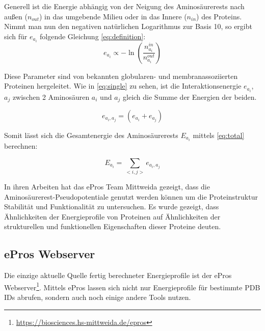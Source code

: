 Generell ist die Energie abhängig von der Neigung des Aminosäurerests nach außen ($n_{out}$) in das umgebende Milieu oder in das Innere ($n_{in}$) des Proteins. Nimmt man nun den negativen natürlichen Logarithmus zur Basis 10, so ergibt sich für $e_{a_i}$ folgende Gleichung \ref{eq:definition}:
%
\begin{equation}
  	e_{a_i} \propto -\ln{\left(\frac{n_{a_i}^{in}}{n_{a_i}^{out}}\right)}
  	\label{eq:definition}
\end{equation}

Diese Parameter sind von bekannten globularen- und membranassoziierten Proteinen hergeleitet. Wie in \ref{eq:single} zu sehen, ist die Interaktionsenergie $e_{a_{i}}$, $a_{j}$ zwischen 2 Aminosäuren $a_{i}$ und $a_{j}$ gleich die Summe der Energien der beiden. 

\begin{equation}
  	e_{a_{i},a_{j}} = \left( e_{a_{i}} + e_{a_{j}} \right)
    \label{eq:single}
\end{equation}

Somit lässt sich die Gesamtenergie des Aminosäurerests $E_{a_i}$ mittels \ref{eq:total} berechnen:

\begin{equation}
    E_{a_{i}} = \sum_{< i, j >}{e_{a_{i},a_{j}}}
    \label{eq:total}
\end{equation}

In ihren Arbeiten hat das ePros Team Mittweida gezeigt, dass die Aminosäurerest-Pseudopotentiale genutzt werden können um die Proteinstruktur Stabilität und Funktionalität zu untersuchen. Es wurde gezeigt, dass Ähnlichkeiten der Energieprofile von Proteinen auf Ähnlichkeiten der strukturellen und funktionellen Eigenschaften dieser Proteine deuten\cite{Heinke.2011}.


\subsection{ePros Webserver}
\label{sec:epros}
Die einzige aktuelle Quelle fertig berechneter Energieprofile ist der ePros Webserver\footnote{\url{https://biosciences.hs-mittweida.de/epros}}. Mittels ePros lassen sich nicht nur Energieprofile für bestimmte \ac{PDB} IDs abrufen, sondern auch noch einige andere Tools nutzen.

